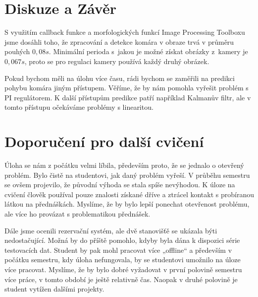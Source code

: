 \documentclass[a4paper,10pt]{article}
\begin{document}
\section{Diskuze a Závěr}

S využitím callback funkce a 
morfologických funkcí Image Processing Toolboxu jsme dosáhli toho, že zpracování a 
detekce komára v obraze trvá v průměru pouhých $0,08 s$. 
Minimální perioda s~jakou je možné získat obrázky z~kamery je $0,067 s$,
proto se pro regulaci kamery používá každý druhý obrázek.

Pokud bychom měli na úlohu více času, rádi bychom se zaměřili na predikci pohybu komára jiným přístupem.
Věříme, že by nám pomohla vyřešit problém s PI regulátorem.
K další přístupům predikce patří například Kalmanův filtr, 
ale v tomto přístupu očekáváme problémy s linearitou. 
 
\section*{Doporučení pro další cvičení}

Úloha se nám z počátku velmi líbila, především proto, že se jednalo o otevřený problém. 
Bylo čistě na studentovi, jak daný problém vyřeší. 
V průběhu semestru se ovšem projevilo, že původní výhoda se stala spíše nevýhodou. 
K úloze na cvičení člověk používal pouze znalosti získané dříve a ztrácel kontakt s probíranou látkou na přednáškách.
Myslíme, že by bylo lepší ponechat otevřenost problému, ale více ho provázat s problematikou přednášek.

Dále jsme ocenili rezervační systém, ale dvě stanovišťě se ukázala býti nedostačující. 
Možná by do příště pomohlo, kdyby byla dána k dispozici série testovacích dat. 
Student by pak mohl pracovat více „offline“ a především v počátku semestru, 
kdy úloha nefungovala, by se studentovi umožnilo na úloze více pracovat.
Myslíme, že by bylo dobré vyžadovat v první polovině semestru více práce, 
v tomto období je ještě relativně čas. 
Naopak v druhé polovině je student vytížen dalšími projekty.





\end{document}
